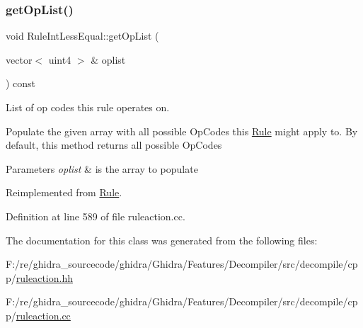 \subsubsection{\texorpdfstring{getOpList()}{getOpList()}}
{\footnotesize\ttfamily void Rule\+Int\+Less\+Equal\+::get\+Op\+List (\begin{DoxyParamCaption}\item[{vector$<$ uint4 $>$ \&}]{oplist }\end{DoxyParamCaption}) const\hspace{0.3cm}{\ttfamily [virtual]}}



List of op codes this rule operates on. 

Populate the given array with all possible Op\+Codes this \mbox{\hyperlink{class_rule}{Rule}} might apply to. By default, this method returns all possible Op\+Codes 
\begin{DoxyParams}{Parameters}
{\em oplist} & is the array to populate \\
\hline
\end{DoxyParams}


Reimplemented from \mbox{\hyperlink{class_rule_a4023bfc7825de0ab866790551856d10e}{Rule}}.



Definition at line 589 of file ruleaction.\+cc.



The documentation for this class was generated from the following files\+:\begin{DoxyCompactItemize}
\item 
F\+:/re/ghidra\+\_\+sourcecode/ghidra/\+Ghidra/\+Features/\+Decompiler/src/decompile/cpp/\mbox{\hyperlink{ruleaction_8hh}{ruleaction.\+hh}}\item 
F\+:/re/ghidra\+\_\+sourcecode/ghidra/\+Ghidra/\+Features/\+Decompiler/src/decompile/cpp/\mbox{\hyperlink{ruleaction_8cc}{ruleaction.\+cc}}\end{DoxyCompactItemize}
